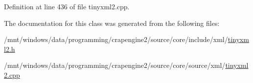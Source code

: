 Definition at line 436 of file tinyxml2.\+cpp.



The documentation for this class was generated from the following files\+:\begin{DoxyCompactItemize}
\item 
/mnt/windows/data/programming/crapengine2/source/core/include/xml/\hyperlink{tinyxml2_8h}{tinyxml2.\+h}\item 
/mnt/windows/data/programming/crapengine2/source/core/source/xml/\hyperlink{tinyxml2_8cpp}{tinyxml2.\+cpp}\end{DoxyCompactItemize}
